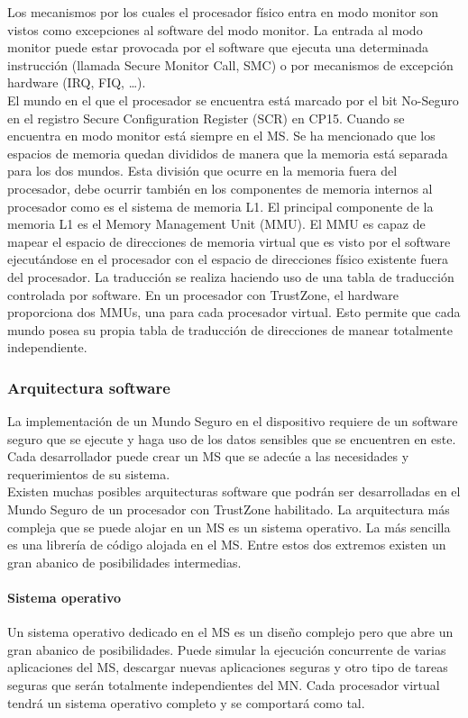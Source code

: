 Los mecanismos por los cuales el procesador físico entra en modo monitor son vistos como excepciones al software del modo monitor. La entrada al modo monitor puede estar provocada por el software que ejecuta una determinada instrucción (llamada Secure Monitor Call, SMC) o por mecanismos de excepción hardware (IRQ, FIQ, …). \\
El mundo en el que el procesador se encuentra está marcado por el bit No-Seguro en el registro Secure Configuration Register (SCR) en CP15. Cuando se encuentra en modo monitor está siempre en el MS.
Se ha mencionado que los espacios de memoria quedan divididos de manera que la memoria está separada para los dos mundos. Esta división que ocurre en la memoria fuera del procesador, debe ocurrir también en los componentes de memoria internos al procesador como es el sistema de memoria L1. El principal componente de la memoria L1 es el Memory Management Unit (MMU). El MMU es capaz de mapear el espacio de direcciones de memoria virtual que es visto por el software ejecutándose en el procesador con el espacio de direcciones físico existente fuera del procesador. La traducción se realiza haciendo uso de una tabla de traducción controlada por software.
En un procesador con TrustZone, el hardware proporciona dos MMUs, una para cada procesador virtual. Esto permite que cada mundo posea su propia tabla de traducción de direcciones de manear totalmente independiente.

\subsubsection{Arquitectura software}

La implementación de un Mundo Seguro en el dispositivo requiere de un software seguro que se ejecute y haga uso de los datos sensibles que se encuentren en este. Cada desarrollador puede crear un MS que se adecúe a las necesidades y requerimientos de su sistema. \\
Existen muchas posibles arquitecturas software que podrán ser desarrolladas en el Mundo Seguro de un procesador con TrustZone habilitado. La arquitectura más compleja que se puede alojar en un MS es un sistema operativo. La más sencilla es una librería de código alojada en el MS. Entre estos dos extremos existen un gran abanico de posibilidades intermedias.


\paragraph{Sistema operativo} 
Un sistema operativo dedicado en el MS es un diseño complejo pero que abre un gran abanico de posibilidades. Puede simular la ejecución concurrente de varias aplicaciones del MS, descargar nuevas aplicaciones seguras y otro tipo de tareas seguras que serán totalmente independientes del MN. Cada procesador virtual tendrá un sistema operativo completo y se comportará como tal.

